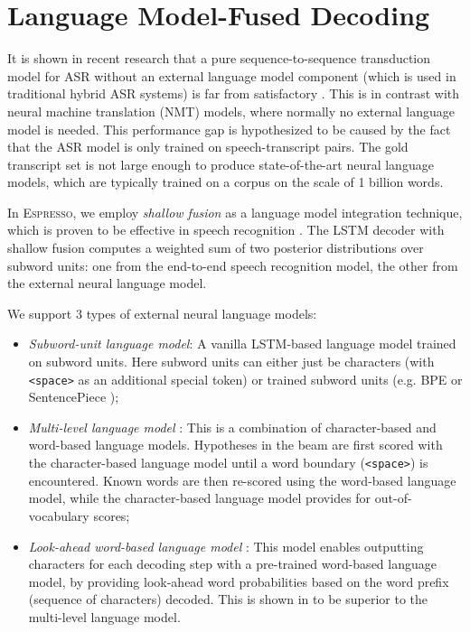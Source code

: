 \documentclass{article}
\def\espresso{\textsc{Espresso}\xspace}
\begin{document}
\section{Language Model-Fused Decoding}
\label{sec:fusion}
It is shown in recent research that a pure sequence-to-sequence transduction model for ASR without an external language model component (which is used in traditional hybrid ASR systems) is far from satisfactory \cite{kannan2018analysis}. This is in contrast with neural machine translation (NMT) models, where normally no external language model is needed. This performance gap is hypothesized to be caused by the fact that the ASR model is only trained on speech-transcript pairs. The gold transcript set is not large enough to produce state-of-the-art neural language models, which are typically trained on a corpus on the scale of 1 billion words. 

In \espresso, we employ \emph{shallow fusion} \cite{gulcehre2015using} as a language model integration technique, which is proven to be effective in speech recognition \cite{kannan2018analysis,toshniwal2018comparison}. The LSTM decoder with shallow fusion computes a weighted sum of two posterior distributions over subword units: one from the end-to-end speech recognition model, the other from the external neural language model. 

We support 3 types of external neural language models:
\begin{itemize} \setlength\itemsep{0cm}
    \item \emph{Subword-unit language model}: A vanilla LSTM-based language model trained on subword units. Here subword units can either just be characters (with \texttt{<space>} as an additional special token) or trained subword units (e.g. BPE \cite{sennrich2016neural} or SentencePiece \cite{kudo2018subword});
    \item \emph{Multi-level language model} \cite{hori2017multilevel}: This is a combination of character-based and word-based language models. Hypotheses in the beam are first scored with the character-based language model until a word boundary (\texttt{<space>}) is encountered. Known words are then re-scored using the word-based language model, while the character-based language model provides for out-of-vocabulary scores;
    \item \emph{Look-ahead word-based language model} \cite{hori2018endtoend}: This model enables outputting characters for each decoding step with a pre-trained word-based language model, by providing look-ahead word probabilities based on the word prefix (sequence of characters) decoded. This is shown in \cite{hori2018endtoend} to be superior to the multi-level language model.
\end{itemize}
\end{document}
